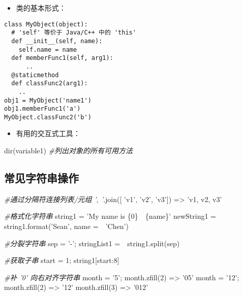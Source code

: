 \documentclass[]{article}
\newenvironment{Shaded}{}{}
\newcommand{\DecValTok}[1]{\textcolor[rgb]{0.25,0.63,0.44}{#1}}
\newcommand{\SpecialCharTok}[1]{\textcolor[rgb]{0.25,0.44,0.63}{#1}}
\newcommand{\StringTok}[1]{\textcolor[rgb]{0.25,0.44,0.63}{#1}}
\newcommand{\CommentTok}[1]{\textcolor[rgb]{0.38,0.63,0.69}{\textit{#1}}}
\newcommand{\OperatorTok}[1]{\textcolor[rgb]{0.40,0.40,0.40}{#1}}
\newcommand{\BuiltInTok}[1]{#1}
\newcommand{\NormalTok}[1]{#1}
\begin{document}
\begin{itemize}
\item
  类的基本形式：
\end{itemize}

\begin{verbatim}
class MyObject(object):
  # 'self' 等价于 Java/C++ 中的 'this'
  def __init__(self, name):
    self.name = name
  def memberFunc1(self, arg1):
      ..
  @staticmethod
  def classFunc2(arg1):
    ..
obj1 = MyObject('name1')
obj1.memberFunc1('a')
MyObject.classFunc2('b')
\end{verbatim}

\begin{itemize}
\item
  有用的交互式工具：
\end{itemize}

\begin{Shaded}
\begin{Highlighting}[]
\BuiltInTok{dir}\NormalTok{(variable1) }\CommentTok{#列出对象的所有可用方法}
\end{Highlighting}
\end{Shaded}

\hypertarget{header-n354}{\subsection{常见字符串操作}\label{header-n354}}

\begin{Shaded}
\begin{Highlighting}[]
\CommentTok{#通过分隔符连接列表/元组}
\CommentTok{', '}\NormalTok{.join([ }\StringTok{'v1'}\NormalTok{, }\StringTok{'v2'}\NormalTok{, }\StringTok{'v3'}\NormalTok{]) }\OperatorTok{=>} \StringTok{'v1, v2, v3'}

\CommentTok{#格式化字符串}
\NormalTok{string1 }\OperatorTok{=} \StringTok{'My name is }\SpecialCharTok{\{0\}}\StringTok{　}\SpecialCharTok{\{name\}}\StringTok{'}
\NormalTok{newString1 }\OperatorTok{=}\NormalTok{ string1.}\BuiltInTok{format}\NormalTok{(}\StringTok{'Sean'}\NormalTok{, name }\OperatorTok{=}　\StringTok{'Chen'}\NormalTok{)}

\CommentTok{#分裂字符串}
\NormalTok{sep }\OperatorTok{=} \StringTok{'-'}\OperatorTok{;}
\NormalTok{stringList1 }\OperatorTok{=}\NormalTok{　string1.split(sep)}

\CommentTok{#获取子串}
\NormalTok{start }\OperatorTok{=} \DecValTok{1}\OperatorTok{;}
\NormalTok{string1[start:}\DecValTok{8}\NormalTok{]}

\CommentTok{#补 '0' 向右对齐字符串}
\NormalTok{month }\OperatorTok{=} \StringTok{'5'}\OperatorTok{;}
\NormalTok{month.zfill(}\DecValTok{2}\NormalTok{) }\OperatorTok{=>} \StringTok{'05'}
\NormalTok{month }\OperatorTok{=} \StringTok{'12'}\OperatorTok{;}
\NormalTok{month.zfill(}\DecValTok{2}\NormalTok{) }\OperatorTok{=>} \StringTok{'12'}
\NormalTok{month.zfill(}\DecValTok{3}\NormalTok{) }\OperatorTok{=>} \StringTok{'012'}
\end{Highlighting}
\end{Shaded}
\end{document}
